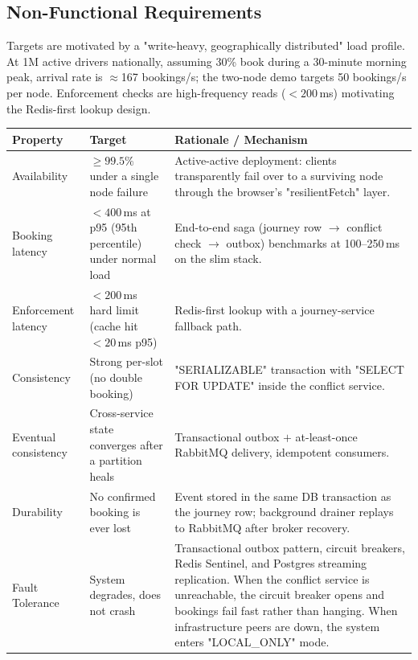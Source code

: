 \documentclass[11pt,a4paper]{article}
\begin{document}
\subsection{Non-Functional Requirements}
\label{sec:nfr}

Targets are motivated by a "write-heavy, geographically distributed" load profile. At 1M active drivers nationally, assuming 30\% book during a 30-minute morning peak, arrival rate is $\approx$167 bookings/s; the two-node demo targets 50 bookings/s per node. Enforcement checks are high-frequency reads ($<200$\,ms) motivating the Redis-first lookup design.

\begin{table}[H]
\centering\small
\begin{tabularx}{\textwidth}{L{3.2cm} L{4.4cm} X}
  \toprule
  \textbf{Property} & \textbf{Target} & \textbf{Rationale / Mechanism} \\
  \midrule
  Availability & $\geq 99.5\%$ under a single node failure & Active-active
        deployment: clients transparently fail over to a surviving node
        through the browser's "resilientFetch" layer. \\
  Booking latency & $<400\,$ms at p95 (95th percentile) under normal load & End-to-end saga (journey row $\to$ conflict check $\to$ outbox) benchmarks at 100--250\,ms on the slim stack. \\
  Enforcement latency & $<200\,$ms hard limit (cache hit $<20\,$ms p95) & Redis-first lookup with a journey-service fallback path. \\
  Consistency & Strong per-slot (no double booking) & "SERIALIZABLE"
        transaction with "SELECT FOR UPDATE" inside the conflict
        service. \\
  Eventual consistency & Cross-service state converges after a partition
        heals & Transactional outbox $+$ at-least-once RabbitMQ delivery,
        idempotent consumers. \\
  Durability & No confirmed booking is ever lost & Event stored in the same
        DB transaction as the journey row; background drainer replays to
        RabbitMQ after broker recovery. \\
  Fault Tolerance & System degrades, does not crash & Transactional outbox pattern, circuit breakers, Redis Sentinel, and Postgres streaming replication. When the conflict service is unreachable, the circuit breaker opens and bookings fail fast rather than hanging. When infrastructure peers are down, the system enters "LOCAL\_ONLY" mode. \\

\end{tabularx}
\end{table}
\end{document}
